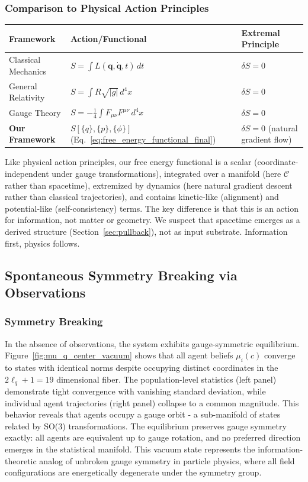 \documentclass[11pt]{article}
\begin{document}
\subsubsection{Comparison to Physical Action Principles}

\begin{table}[h]
\centering
\begin{tabular}{|l|l|l|}
\hline
\textbf{Framework} & \textbf{Action/Functional} & \textbf{Extremal Principle} \\
\hline
Classical Mechanics & $S = \int L(\mathbf{q}, \dot{\mathbf{q}}, t) \, dt$ & $\delta S = 0$ \\
General Relativity & $S = \int R \sqrt{|g|} \, d^4x$ & $\delta S = 0$ \\
Gauge Theory & $S = -\frac{1}{4}\int F_{\mu\nu}F^{\mu\nu} \, d^4x$ & $\delta S = 0$ \\
\textbf{Our Framework} & $S[\{q\}, \{p\}, \{\phi\}]$ (Eq.~\ref{eq:free_energy_functional_final}) & $\delta S = 0$ (natural gradient flow) \\
\hline
\end{tabular}
\end{table}

Like physical action principles, our free energy functional is a scalar (coordinate-independent under gauge transformations), integrated over a manifold (here $\mathcal{C}$ rather than spacetime), extremized by dynamics (here natural gradient descent rather than classical trajectories), and contains kinetic-like (alignment) and potential-like (self-consistency) terms. The key difference is that this is an action for information, not matter or geometry. We suspect that spacetime emerges as a derived structure (Section~\ref{sec:pullback}), not as input substrate. Information first, physics follows.

\subsection{Spontaneous Symmetry Breaking via Observations}
\label{sec:symmetry_breaking}

\subsubsection{Symmetry Breaking}


In the absence of observations, the system exhibits gauge-symmetric equilibrium. Figure~\ref{fig:mu_q_center_vacuum} shows that all agent beliefs $\mu_i(c)$ converge to states with identical norms despite occupying distinct coordinates in the $2\ell_q + 1 = 19$ dimensional fiber. The population-level statistics (left panel) demonstrate tight convergence with vanishing standard deviation, while individual agent trajectories (right panel) collapse to a common magnitude. This behavior reveals that agents occupy a gauge orbit - a sub-manifold of states related by SO(3) transformations. The equilibrium preserves gauge symmetry exactly: all agents are equivalent up to gauge rotation, and no preferred direction emerges in the statistical manifold. This vacuum state represents the information-theoretic analog of unbroken gauge symmetry in particle physics, where all field configurations are energetically degenerate under the symmetry group.
\end{document}
